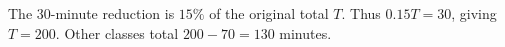 The $30$-minute reduction is $15\%$ of the original total $T$. Thus $0.15T=30$, giving $T=200$. Other classes total $200-70=\boxed{130}$ minutes.

